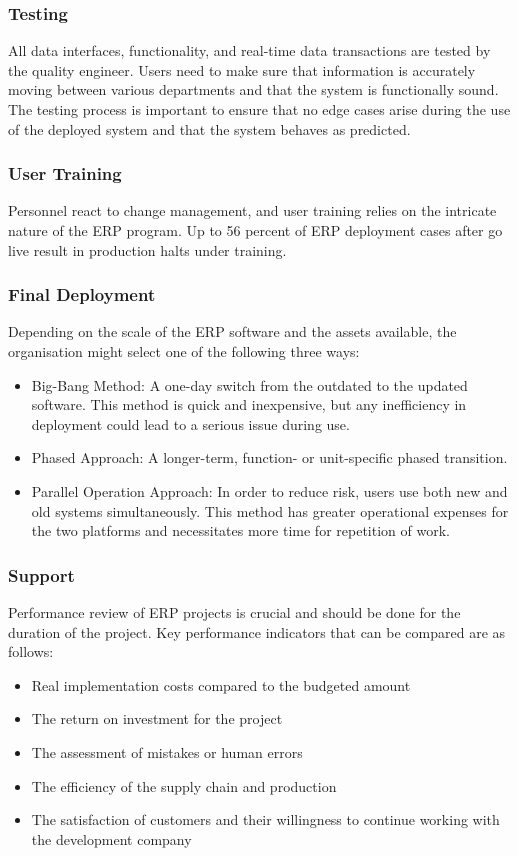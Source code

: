 \subsubsection{Testing}
\par{All data interfaces, functionality, and real-time data transactions are tested by the quality engineer. Users need to make sure that information is accurately moving between various departments and that the system is functionally sound. The testing process is important to ensure that no edge cases arise during the use of the deployed system and that the system behaves as predicted.}
\subsubsection{User Training}
\par{Personnel react to change management, and user training relies on the intricate nature of the ERP program. Up to 56 percent of ERP deployment cases after go live result in production halts under training.}
\subsubsection{Final Deployment}
\par{Depending on the scale of the ERP software and the assets available, the organisation might select one of the following three ways:}
\begin{itemize}
    \item Big-Bang Method: A one-day switch from the outdated to the updated software. This method is quick and inexpensive, but any inefficiency in deployment could lead to a serious issue during use.
    \item Phased Approach: A longer-term, function- or unit-specific phased transition.
    \item Parallel Operation Approach: In order to reduce risk, users use both new and old systems simultaneously.
    This method has greater operational expenses for the two platforms and necessitates more time for repetition of work.
\end{itemize}
\subsubsection{Support}
\par{Performance review of ERP projects is crucial and should be done for the duration of the project. Key performance indicators that can be compared are as follows:}
\begin{itemize}
    \item Real implementation costs compared to the budgeted amount
    \item The return on investment for the project
    \item The assessment of mistakes or human errors
    \item The efficiency of the supply chain and production
    \item The satisfaction of customers and their willingness to continue working with the development company
\end{itemize}
